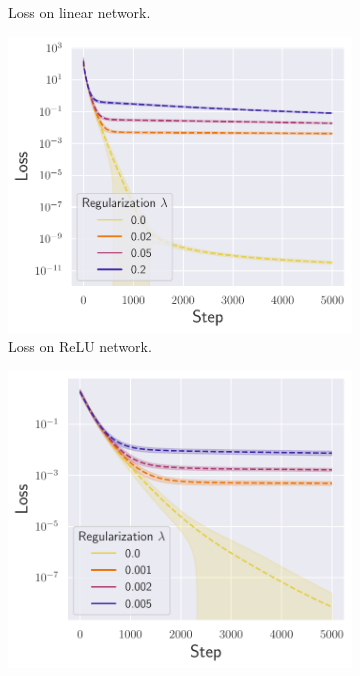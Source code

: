 \begin{figure}[ht]
\begin{subfigure}[b]{.33\textwidth}
  \caption{Loss on linear network.}
  \label{fig:loss_lr_non_autograd_l2}
\end{subfigure}\hfill
\begin{subfigure}[b]{.33\textwidth}
  \centering
  \includegraphics[width=\linewidth]{figures/loss_nn_relu_autograd_l2_v1.pdf}
  \caption{Loss on ReLU network.}
  \label{fig:loss_nn_relu_autograd_l2}
\end{subfigure}\hfill
\begin{subfigure}[b]{.33\textwidth}
  \centering
  \includegraphics[width=\linewidth]{figures/loss_nn_tanh_autograd_l2_v1.pdf}

\end{subfigure}
\end{figure}

